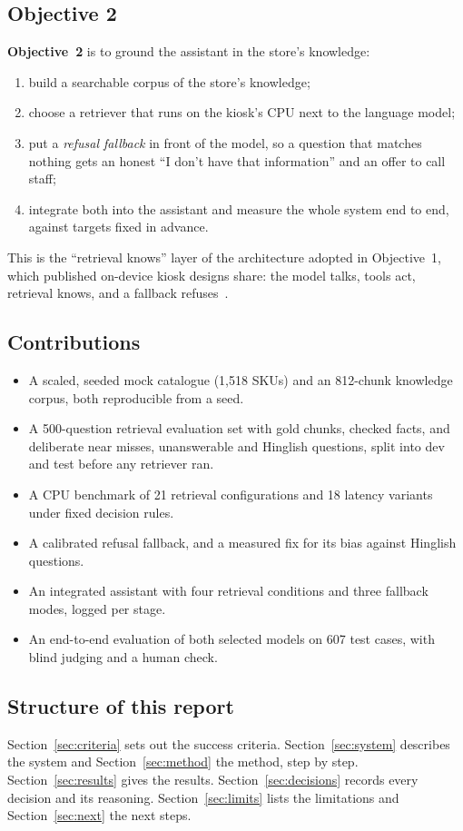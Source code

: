 \documentclass[11pt,a4paper]{article}
\begin{document}
\subsection{Objective 2}
\textbf{Objective~2} is to ground the assistant in the store's knowledge:
\begin{enumerate}
  \item build a searchable corpus of the store's knowledge;
  \item choose a retriever that runs on the kiosk's CPU next to the language model;
  \item put a \emph{refusal fallback} in front of the model, so a question that matches nothing gets an honest
        ``I don't have that information'' and an offer to call staff;
  \item integrate both into the assistant and measure the whole system end to end, against targets fixed in advance.
\end{enumerate}
This is the ``retrieval knows'' layer of the architecture adopted in Objective~1, which published on-device kiosk
designs share: the model talks, tools act, retrieval knows, and a fallback refuses~\cite{rag}.

\subsection{Contributions}
\begin{itemize}
  \item A scaled, seeded mock catalogue (1,518 SKUs) and an 812-chunk knowledge corpus, both reproducible from a seed.
  \item A 500-question retrieval evaluation set with gold chunks, checked facts, and deliberate near misses, unanswerable
        and Hinglish questions, split into dev and test before any retriever ran.
  \item A CPU benchmark of 21 retrieval configurations and 18 latency variants under fixed decision rules.
  \item A calibrated refusal fallback, and a measured fix for its bias against Hinglish questions.
  \item An integrated assistant with four retrieval conditions and three fallback modes, logged per stage.
  \item An end-to-end evaluation of both selected models on 607 test cases, with blind judging and a human check.
\end{itemize}

\subsection{Structure of this report}
Section~\ref{sec:criteria} sets out the success criteria. Section~\ref{sec:system} describes the system and
Section~\ref{sec:method} the method, step by step. Section~\ref{sec:results} gives the results.
Section~\ref{sec:decisions} records every decision and its reasoning. Section~\ref{sec:limits} lists the limitations
and Section~\ref{sec:next} the next steps.
\end{document}
